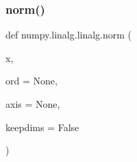  \mbox{\label{namespacenumpy_1_1linalg_1_1linalg_a1501a29cdf07bffd60e449124792b6ef}} 
\subsubsection{\texorpdfstring{norm()}{norm()}}
{\footnotesize\ttfamily def numpy.\+linalg.\+linalg.\+norm (\begin{DoxyParamCaption}\item[{}]{x,  }\item[{}]{ord = {\ttfamily None},  }\item[{}]{axis = {\ttfamily None},  }\item[{}]{keepdims = {\ttfamily False} }\end{DoxyParamCaption})}

